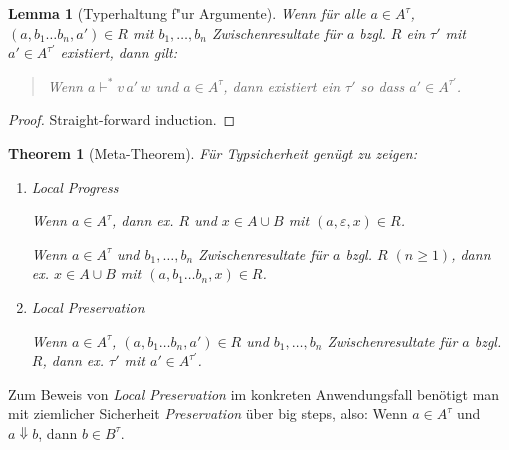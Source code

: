 \documentclass[12pt,a2paper,draft]{article}
\newtheorem{lemma}{Lemma}
\newtheorem{theorem}{Theorem}
\begin{document}
\begin{lemma}[Typerhaltung f"ur Argumente] \label{lemma:Argument_preservation}
  Wenn f\"ur alle $a \in A^\tau$, $(a,b_1 \ldots b_n,a') \in R$ mit $b_1,\ldots,b_n$ Zwischenresultate
  f\"ur $a$ bzgl. $R$ ein $\tau'$ mit $a' \in A^{\tau'}$ existiert, dann gilt:
  \begin{quote}
    Wenn $a \vdash^* v\,a'\,w$ und $a \in A^\tau$, dann existiert ein $\tau'$ so dass $a' \in A^{\tau'}$.
  \end{quote}
\end{lemma}

\begin{proof}
  Straight-forward induction.
\end{proof}

\begin{theorem}[Meta-Theorem]
  F\"ur Typsicherheit gen\"ugt zu zeigen:
  \begin{enumerate}
  \item \emph{Local Progress}

    Wenn $a \in A^\tau$, dann ex. $R$ und $x \in A \cup B$ mit $(a,\varepsilon,x) \in R$.

    Wenn $a \in A^\tau$ und $b_1,\ldots,b_n$ Zwischenresultate f\"ur $a$ bzgl. $R$ $(n \ge 1)$,
    dann ex. $x \in A \cup B$ mit $(a,b_1 \ldots b_n,x) \in R$.

  \item \emph{Local Preservation}

    Wenn $a \in A^\tau$, $(a,b_1 \ldots b_n,a') \in R$ und $b_1,\ldots,b_n$ Zwischenresultate
    f\"ur $a$ bzgl. $R$, dann ex. $\tau'$ mit $a' \in A^{\tau'}$.
  \end{enumerate}
\end{theorem}

\noindent
Zum Beweis von \emph{Local Preservation} im konkreten Anwendungsfall ben\"otigt man mit ziemlicher
Sicherheit \emph{Preservation} \"uber big steps, also: Wenn $a \in A^\tau$ und $a \Downarrow b$,
dann $b \in B^\tau$.
\end{document}
